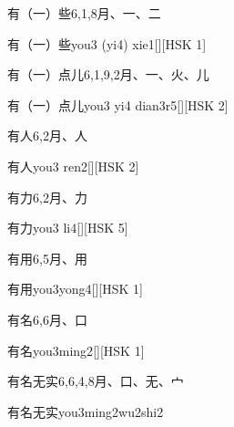 \begin{entry}{有（一）些}{6,1,8}{⽉、⼀、⼆}
  \begin{phonetics}{有（一）些}{you3 (yi4) xie1}[][HSK 1]
  \end{phonetics}
\end{entry}

\begin{entry}{有（一）点儿}{6,1,9,2}{⽉、⼀、⽕、⼉}
  \begin{phonetics}{有（一）点儿}{you3 yi4 dian3r5}[][HSK 2]
  \end{phonetics}
\end{entry}

\begin{entry}{有人}{6,2}{⽉、⼈}
  \begin{phonetics}{有人}{you3 ren2}[][HSK 2]
  \end{phonetics}
\end{entry}

\begin{entry}{有力}{6,2}{⽉、⼒}
  \begin{phonetics}{有力}{you3 li4}[][HSK 5]
  \end{phonetics}
\end{entry}

\begin{entry}{有用}{6,5}{⽉、⽤}
  \begin{phonetics}{有用}{you3yong4}[][HSK 1]
  \end{phonetics}
\end{entry}

\begin{entry}{有名}{6,6}{⽉、⼝}
  \begin{phonetics}{有名}{you3ming2}[][HSK 1]
  \end{phonetics}
\end{entry}

\begin{entry}{有名无实}{6,6,4,8}{⽉、⼝、⽆、⼧}
  \begin{phonetics}{有名无实}{you3ming2wu2shi2}
  \end{phonetics}
\end{entry}

